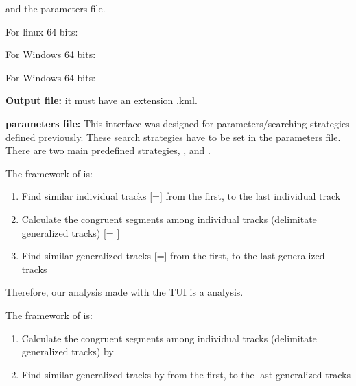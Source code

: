 and the parameters file.


For linux 64 bits:
\vspace{-7\baselineskip}
\vspace{7\baselineskip}




%
%
%


For Windows 64 bits:



For Windows 64 bits:



\textbf{Output file:} it must have an extension .kml. 


\textbf{parameters file:} This interface was designed for parameters/searching strategies defined previously. These search strategies have to be set in the parameters file. There are two main predefined strategies, , and .




The framework of  is: 
\begin{enumerate}
 \item Find similar individual tracks [=] from the first, to the last individual track
 \item Calculate the congruent segments among individual tracks (delimitate generalized tracks) [= ]
 \item Find similar generalized tracks  [=] from the first, to the last generalized tracks
\end{enumerate}
Therefore, our analysis made with the TUI is a  analysis.


The framework of  is: 
\begin{enumerate}
 \item Calculate the congruent segments among individual tracks (delimitate generalized tracks) by 
 \item Find similar generalized tracks by  from the first, to the last generalized tracks
\end{enumerate}

